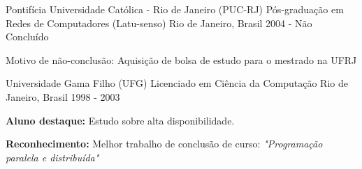 \begin{cventries}

\cventry
{Pontifícia Universidade Católica - Rio de Janeiro (PUC-RJ)} %
{Pós-graduação em Redes de Computadores (Latu-senso)} %
{Rio de Janeiro, Brasil} %
{2004 - Não Concluído} %
{ %
\begin{cvitems}
    \item {Motivo de não-conclusão: Aquisição de bolsa de estudo para o mestrado na UFRJ}
\end{cvitems}
}


\cventry
{Universidade Gama Filho (UFG)} %
{Licenciado em Ciência da Computação} %
{Rio de Janeiro, Brasil} %
{1998 - 2003} %
{ %
\begin{cvitems}
    \item \textbf{Aluno destaque:} Estudo sobre alta disponibilidade.
    \item \textbf{Reconhecimento:} Melhor trabalho de conclusão de curso: \textit{"Programação paralela e distribuída"}
\end{cvitems}
}










\end{cventries}
